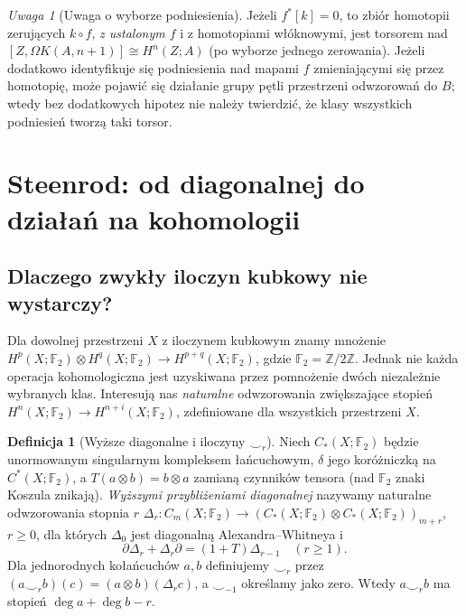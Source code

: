 \documentclass[11pt,a4paper,oneside]{report}
\newcommand{\F}{\mathbb{F}}
\newcommand{\Z}{\mathbb{Z}}
\theoremstyle{plain}
\theoremstyle{definition}
\newtheorem{definicja}[twierdzenie]{Definicja}
\theoremstyle{remark}
\newtheorem{uwaga}[twierdzenie]{Uwaga}
\begin{document}
\begin{uwaga}[Uwaga o wyborze podniesienia]
Jeżeli $f^*[k]=0$, to zbiór homotopii
zerujących $k\circ f$, \emph{z ustalonym $f$}
i z homotopiami włóknowymi, jest torsorem
nad $[Z,\Omega K(A,n+1)]\cong H^n(Z;A)$
(po wyborze jednego zerowania). Jeżeli dodatkowo
identyfikuje się podniesienia nad mapami $f$
zmieniającymi się przez homotopię, może pojawić się
działanie grupy pętli przestrzeni odwzorowań do $B$;
wtedy bez dodatkowych hipotez nie należy twierdzić,
że klasy wszystkich podniesień tworzą taki torsor.
\end{uwaga}

\section{Steenrod: od diagonalnej do działań na kohomologii}
\subsection*{Dlaczego zwykły iloczyn kubkowy nie wystarczy?}
Dla dowolnej przestrzeni $X$ z iloczynem kubkowym
znamy mnożenie $H^p(X;\F_2)\otimes H^q(X;\F_2)
\to H^{p+q}(X;\F_2)$, gdzie $\F_2=\Z/2\Z$.
Jednak nie każda operacja kohomologiczna jest
uzyskiwana przez pomnożenie dwóch niezależnie
wybranych klas. Interesują nas \emph{naturalne}
odwzorowania zwiększające stopień
$H^n(X;\F_2)\to H^{n+i}(X;\F_2)$,
zdefiniowane dla wszystkich przestrzeni $X$.

\begin{definicja}[Wyższe diagonalne i iloczyny $\smile_r$]
Niech $C_*(X;\F_2)$ będzie unormowanym singularnym
kompleksem łańcuchowym, $\delta$ jego koróżniczką
na $C^*(X;\F_2)$, a $T(a\otimes b)=b\otimes a$
zamianą czynników tensora (nad $\F_2$ znaki
Koszula znikają). \emph{Wyższymi przybliżeniami diagonalnej}
nazywamy naturalne odwzorowania stopnia $r$
\(\Delta_r:C_m(X;\F_2)\to
(C_*(X;\F_2)\otimes C_*(X;\F_2))_{m+r}\),
$r\ge0$, dla których $\Delta_0$ jest diagonalną
Alexandra--Whitneya i
\[
\partial\Delta_r+\Delta_r\partial=(1+T)\Delta_{r-1}
\quad(r\ge1).
\]
Dla jednorodnych kołańcuchów $a,b$ definiujemy
$\smile_r$ przez
$(a\smile_r b)(c)=(a\otimes b)(\Delta_r c)$,
a $\smile_{-1}$ określamy jako zero.
Wtedy $a\smile_r b$ ma stopień
$\deg a+\deg b-r$.
\end{definicja}
\end{document}
